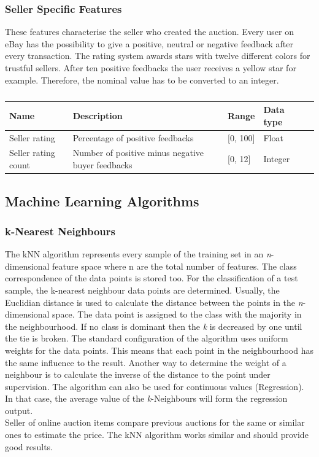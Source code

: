 \subsubsection{Seller Specific Features}
These features characterise the seller who created the auction. Every user on eBay has the possibility to give a positive, neutral or negative feedback after every transaction. The rating system awards stars with twelve different colors for trustful sellers. After ten positive feedbacks the user receives a yellow star for example. Therefore, the nominal value has to be converted to an integer.
\begin{table}[h!]
	\begin{center}
	\begin{tabular}{| l | l | l | l | l |}
		\hline
		Name & Description &  Range & Data type \\
		\hline
		Seller rating & Percentage of positive feedbacks & [0, 100] & Float \\
		\hline
		Seller rating count & Number of positive minus negative buyer feedbacks & [0, 12] & Integer \\
		\hline
	\end{tabular}
	\end{center}
	\caption{}
\end{table}
\subsection{Machine Learning Algorithms}
\subsubsection{k-Nearest Neighbours}
The kNN algorithm \cite{knn} represents every sample of the training set in an \textit{n}-dimensional feature space where n are the total number of features. The class correspondence of the data points is stored too. For the classification of a test sample, the k-nearest neighbour data points are determined. Usually, the Euclidian distance is used to calculate the distance between the points in the \textit{n}-dimensional space. The data point is assigned to the class with the majority in the neighbourhood. If no class is dominant then the \textit{k} is decreased by one until the tie is broken. The standard configuration of the algorithm uses uniform weights for the data points. This means that each point in the neighbourhood has the same influence to the result. Another way to determine the weight of a neighbour is to calculate the inverse of the distance to the point under supervision. The algorithm can also be used for continuous values (Regression). In that case, the average value of the \textit{k}-Neighbours will form the regression output.\\
Seller of online auction items compare previous auctions for the same or similar ones to estimate the price. The kNN algorithm works similar and should provide good results. 
